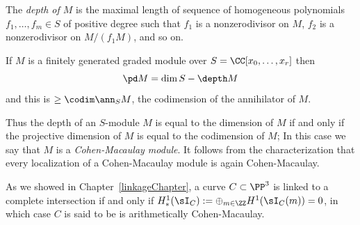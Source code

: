 \begin{definition}
 The \emph{depth of $M$} is the maximal length of sequence of homogeneous polynomials $f_1,\dots,f_m \in S$ of positive degree such that $f_1$ is a nonzerodivisor on $M$, $f_2$ is a nonzerodivisor on $M/(f_1M)$, and so on. 
\end{definition}

\begin{theorem}\label{AB formula}
If $M$ is a finitely generated graded module over $S = \CC[x_0,\dots, x_r]$  then
$$
\pd M = \dim S - \depth M
$$
and this is $\geq \codim \ann_S M$, the codimension of the annihilator of $M$.
\end{theorem}

Thus the depth of an $S$-module $M$ is equal to the dimension of $M$ if and only if the projective dimension
of $M$ is equal to the codimension of $M$; In this case we say that $M$ is a
\emph{Cohen-Macaulay module}. It follows from the characterization that every localization of a Cohen-Macaulay
module is again Cohen-Macaulay.

As we showed in Chapter~\ref{linkageChapter}, a curve $C\subset \PP^3$ is linked to a complete intersection
if and only if  $H^1_*(\sI_C) := \oplus_{m\in \ZZ} H^1(\sI_C(m)) = 0$, in which case $C$ is said to be is arithmetically Cohen-Macaulay. 


%
%
%

